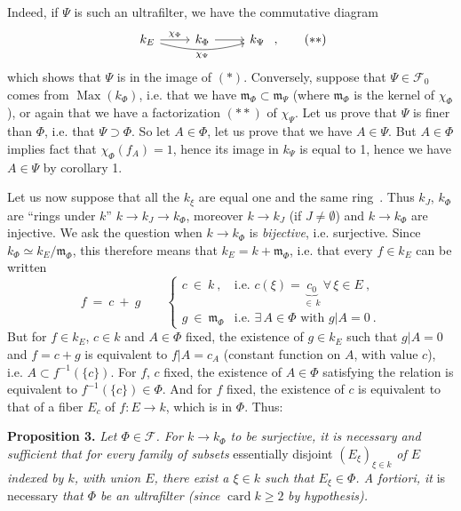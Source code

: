 Indeed, if $\Psi$ is such an ultrafilter, we
have the commutative diagram
\[
\begin{tikzcd}
k_E \arrow[r, "\chi_\Phi"] \arrow[rr, bend right=15, "\chi_\Psi"'] & k_\Phi \arrow[r] & k_\Psi
\end{tikzcd}\ , \tag*{$(**)$}
\]
which shows that $\Psi$ is in the image of $(*)$. Conversely, suppose that $\Psi\in\mathcal{F}_0$ comes from $\operatorname{Max}(k_\Phi)$, i.e. that we have $\mathfrak{m}_\Phi\subset\mathfrak{m}_\Psi$ (where $\mathfrak{m}_\Phi$ is the kernel of $\chi_\Phi$), or again that we have a factorization $(**)$ of $\chi_\Psi$. Let us prove that $\Psi$ is finer than $\Phi$, i.e. that $\Psi\supset\Phi$. So let $A\in\Phi$, let us prove that we have $A\in\Psi$. But $A\in\Phi$ implies fact that $\chi_\Phi(f_A)=1$, hence its image in $k_\Psi$ is equal to 1, hence we have $A\in\Psi$ by corollary 1.


Let us now suppose that all the $k_\xi$ are equal one and the same ring \,. Thus $k_J$, $k_\Phi$ are ``rings under $k$'' $k\longrightarrow k_J\longrightarrow k_\Phi$, moreover $k\longrightarrow k_J$ (if $J\neq\emptyset$) and $k\longrightarrow k_\Phi$ are injective. We ask the question when $k\longrightarrow k_\Phi$ is \textit{bijective}, i.e. surjective. Since $k_\Phi\simeq k_E/\mathfrak{m}_\Phi$, this therefore means that $k_E=k+\mathfrak{m}_\Phi$, i.e. that every $f\in k_E$ can be written
\[
f\ =\ c\ +\ g\qquad
\begin{cases}
c\ \in\ k\ , & \text{i.e. } c(\xi)=\underbrace{c_0}_{\in\,k}\ \forall\,\xi\in E\ ,\\[2ex]
g\ \in\ \mathfrak{m}_\Phi & \text{i.e. } \exists\,A\in\Phi \text{ with } g|A=0\ .
\end{cases}
\]
But for $f\in k_E$, $c\in k$ and $A\in\Phi$ fixed, the existence of $g\in k_E$ such that $g|A=0$ and $f=c+g$ is equivalent to $f|A=c_A$ (constant function on $A$, with value $c$), i.e. $A\subset f^{-1}(\{c\})$. For $f$, $c$ fixed, the existence of $A\in\Phi$ satisfying the relation is equivalent to $f^{-1}(\{c\})\in\Phi$. And for $f$ fixed, the existence of $c$ is equivalent to that of a fiber $E_c$ of $f:E\longrightarrow k$, which is in $\Phi$. Thus:

\textbf{Proposition 3.} \textit{Let $\Phi\in\mathcal{F}$. For $k\longrightarrow k_\Phi$ to be surjective, it is necessary and sufficient that for every family of subsets} essentially disjoint \textit{$(E_\xi)_{\xi\in k}$ of $E$ indexed by $k$, with union $E$, there exist a $\xi\in k$ such that $E_\xi\in\Phi$. A fortiori, it} is necessary \textit{that $\Phi$ be an ultrafilter (since} $\operatorname{card}k\geqslant 2$ \textit{by hypothesis).}

